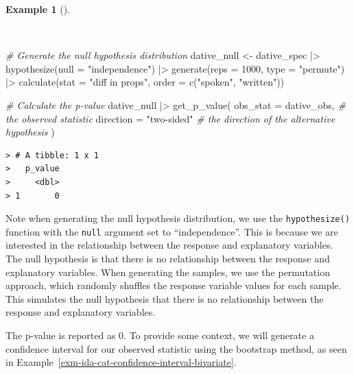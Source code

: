 \documentclass[
  letterpaper,
]{latex/krantz}
\newenvironment{Shaded}{\begin{snugshade}}{\end{snugshade}}
\newcommand{\AttributeTok}[1]{\textcolor[rgb]{0.00,0.00,0.00}{#1}}
\newcommand{\CommentTok}[1]{\textcolor[rgb]{0.00,0.00,0.00}{\textit{#1}}}
\newcommand{\DecValTok}[1]{\textcolor[rgb]{0.00,0.00,0.00}{#1}}
\newcommand{\FunctionTok}[1]{\textcolor[rgb]{0.00,0.00,0.00}{#1}}
\newcommand{\NormalTok}[1]{\textcolor[rgb]{0.00,0.00,0.00}{#1}}
\newcommand{\OtherTok}[1]{\textcolor[rgb]{0.00,0.00,0.00}{#1}}
\newcommand{\SpecialCharTok}[1]{\textcolor[rgb]{0.00,0.00,0.00}{#1}}
\newcommand{\StringTok}[1]{\textcolor[rgb]{0.00,0.00,0.00}{#1}}
\theoremstyle{definition}
\newtheorem{example}{Example}[chapter]
\theoremstyle{remark}
\begin{document}
\begin{example}[]\protect\hypertarget{exm-ida-cat-null-hypothesis-bivariate}{}\label{exm-ida-cat-null-hypothesis-bivariate}

~

\begin{Shaded}
\begin{Highlighting}[]
\CommentTok{\# Generate the null hypothesis distribution}
\NormalTok{dative\_null }\OtherTok{\textless{}{-}}
\NormalTok{  dative\_spec }\SpecialCharTok{|\textgreater{}}
  \FunctionTok{hypothesize}\NormalTok{(}\AttributeTok{null =} \StringTok{"independence"}\NormalTok{) }\SpecialCharTok{|\textgreater{}}
  \FunctionTok{generate}\NormalTok{(}\AttributeTok{reps =} \DecValTok{1000}\NormalTok{, }\AttributeTok{type =} \StringTok{"permute"}\NormalTok{) }\SpecialCharTok{|\textgreater{}}
  \FunctionTok{calculate}\NormalTok{(}\AttributeTok{stat =} \StringTok{"diff in props"}\NormalTok{, }\AttributeTok{order =} \FunctionTok{c}\NormalTok{(}\StringTok{"spoken"}\NormalTok{, }\StringTok{"written"}\NormalTok{))}

\CommentTok{\# Calculate the p{-}value}
\NormalTok{dative\_null }\SpecialCharTok{|\textgreater{}}
  \FunctionTok{get\_p\_value}\NormalTok{(}
    \AttributeTok{obs\_stat =}\NormalTok{ dative\_obs, }\CommentTok{\# the observed statistic}
    \AttributeTok{direction =} \StringTok{"two{-}sided"} \CommentTok{\# the direction of the alternative hypothesis}
\NormalTok{  )}
\end{Highlighting}
\end{Shaded}

\begin{verbatim}
> # A tibble: 1 x 1
>   p_value
>     <dbl>
> 1       0
\end{verbatim}

\end{example}

Note when generating the null hypothesis distribution, we use the
\texttt{hypothesize()} function with the \texttt{null} argument set to
``independence''. This is because we are interested in the relationship
between the response and explanatory variables. The null hypothesis is
that there is no relationship between the response and explanatory
variables. When generating the samples, we use the permutation approach,
which randomly shuffles the response variable values for each sample.
This simulates the null hypothesis that there is no relationship between
the response and explanatory variables.

The p-value is reported as \(0\). To provide some context, we will
generate a confidence interval for our observed statistic using the
bootstrap method, as seen in
Example~\ref{exm-ida-cat-confidence-interval-bivariate}.
\end{document}
